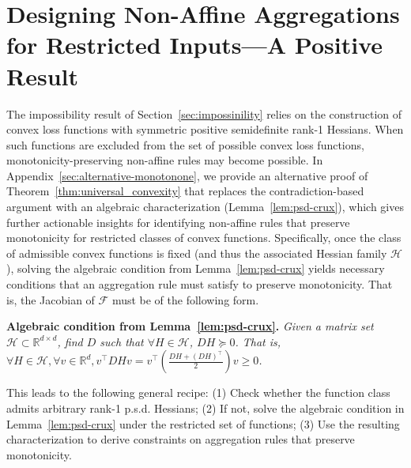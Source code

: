 \documentclass[twoside,11pt]{article}
\newcommand{\R}{\mathbb{R}}
\newcommand{\F}{\mathcal{F}}
\let\todo\relax%
\newcommand{\comm}[3][inline]{\todo[#1, size=\tiny]{#2: #3}}
\newcommand{\batodo}[2][inline]{\comm[color=magenta,#1]{BL}{#2}}
\begin{document}
\section{Designing Non-Affine Aggregations for Restricted Inputs---A Positive Result}\label{sec:positive-result-tm} 
The impossibility result of Section~\ref{sec:impossinility} relies on the construction of convex loss functions with symmetric positive semidefinite rank-1 Hessians. 
When such functions are excluded from the set of possible convex loss functions, monotonicity-preserving non-affine rules may become possible.
In Appendix~\ref{sec:alternative-monotonone}, we provide an alternative proof of Theorem~\ref{thm:universal_convexity}  that replaces the contradiction-based argument with an algebraic characterization (Lemma~\ref{lem:psd-crux}), which gives further actionable insights for identifying non-affine rules that preserve monotonicity for restricted classes of convex functions.
Specifically, once the class of admissible convex functions is fixed (and thus the associated Hessian family $\mathcal{H}$), solving the algebraic condition from Lemma~\ref{lem:psd-crux} yields necessary conditions that an aggregation rule must satisfy to preserve monotonicity.
That is, the Jacobian of $\F$ must be of the following form.
\begin{mdframed}[backgroundcolor=gray!5]
    \vspace{0.5\topsep}
    \textbf{Algebraic condition from Lemma~\ref{lem:psd-crux}.}
    \emph{Given a matrix set $\mathcal{H} \subset \R^{d \times d}$, find $D$ such that $\forall H \in \mathcal{H}$, $DH \succeq 0$.
    That is, $\forall H \in \mathcal{H}, \forall v \in \R^d, v^\intercal DH v = v^\intercal \left(\frac{DH + (DH)^\intercal}{2}\right) v \geq 0$.}
    \vspace{0.5\topsep}
\end{mdframed}
This leads to the following general recipe: (1) Check whether the function class admits arbitrary rank-1 p.s.d. Hessians; (2) If not, solve the algebraic condition in Lemma~\ref{lem:psd-crux} under the restricted set of functions; (3) Use the resulting characterization to derive constraints on aggregation rules that preserve monotonicity. 
 
\end{document}
